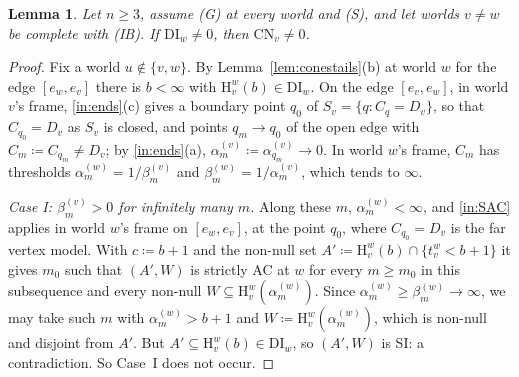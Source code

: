 \documentclass[11pt]{article}
\newtheorem{lemma}[theorem]{Lemma}
\theoremstyle{definition}\newtheorem{definition}[theorem]{Definition}
\theoremstyle{remark}\newtheorem{remark}[theorem]{Remark}
\newcommand{\Hi}[3]{\mathrm H^{#1}_{#2}(#3)}
\newcommand{\CN}{\mathrm{CN}}
\newcommand{\DI}{\mathrm{DI}}
\begin{document}
\begin{lemma}\label{lem:DItoCN}
Let $n\ge3$, assume (G) at every world and (S), and let worlds $v\ne w$ be
complete with (IB). If $\DI_w\ne0$, then $\CN_v\ne0$.
\end{lemma}
\begin{proof}
Fix a world $u\notin\{v,w\}$. By Lemma~\ref{lem:conestails}(b) at world $w$ for the edge $[e_w,e_v]$
there is $b<\infty$ with $\Hi wvb\in\DI_w$. On the edge $[e_v,e_w]$, in
world $v$'s frame, \ref{in:ends}(c) gives a boundary point $q_0$ of
$S_v=\{q:C_q=D_v\}$, so that $C_{q_0}=D_v$ as $S_v$ is closed, and points
$q_m\to q_0$ of the open edge with $C_m\coloneqq C_{q_m}\ne D_v$; by
\ref{in:ends}(a), $\alpha^{(v)}_m\coloneqq\alpha^{(v)}_{q_m}\to0$. In
world $w$'s frame, $C_m$ has thresholds
$\alpha^{(w)}_m=1/\beta^{(v)}_m$ and $\beta^{(w)}_m=1/\alpha^{(v)}_m$, which
tends to $\infty$.

\emph{Case I: $\beta^{(v)}_m>0$ for infinitely many $m$.} Along these $m$,
$\alpha^{(w)}_m<\infty$, and \ref{in:SAC} applies in world $w$'s frame on
$[e_w,e_v]$, at the point $q_0$, where $C_{q_0}=D_v$ is the far vertex
model. With $c\coloneqq b+1$ and the non-null set
$A'\coloneqq\Hi wvb\cap\{t^w_v<b+1\}$ it gives $m_0$ such that $(A',W)$ is
strictly AC at $w$ for every $m\ge m_0$ in this subsequence and every
non-null $W\subseteq\Hi wv{\alpha^{(w)}_m}$. Since
$\alpha^{(w)}_m\ge\beta^{(w)}_m\to\infty$, we may take such $m$ with
$\alpha^{(w)}_m>b+1$ and $W\coloneqq\Hi wv{\alpha^{(w)}_m}$, which is
non-null and disjoint from $A'$. But $A'\subseteq\Hi wvb\in\DI_w$, so
$(A',W)$ is SI: a contradiction. So Case~I does not occur.


\end{proof}
\end{document}
